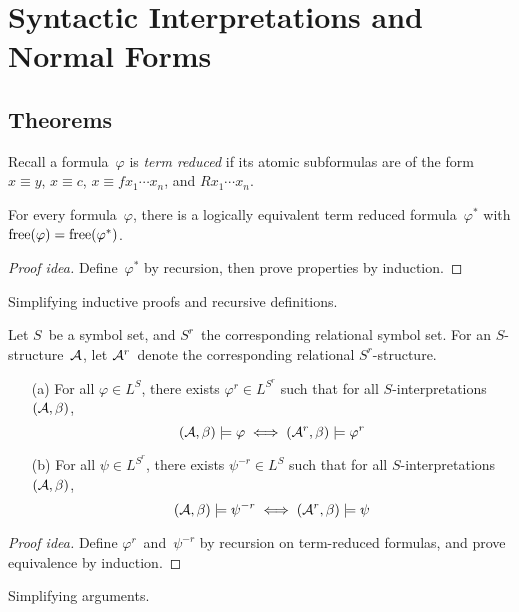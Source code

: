 %
%
\section{Syntactic Interpretations and Normal Forms}
\subsection*{Theorems}
Recall a formula~\(\varphi\) is \emph{term reduced} if its atomic subformulas are of the form \(x\equiv y\), \(x\equiv c\), \(x\equiv f x_1\cdots x_n\), and \(R x_1\cdots x_n\).

\begin{thm}
For every formula~\(\varphi\), there is a logically equivalent term reduced formula~\(\varphi^*\) with \(\operatorname{free}(\varphi)=\operatorname{free}(\varphi^*)\).
\end{thm}
\begin{proof}[Proof idea]
Define~\(\varphi^*\) by recursion, then prove properties by induction.
\end{proof}
\begin{app}
Simplifying inductive proofs and recursive definitions.
\end{app}

\begin{thm}
Let \(S\)~be a symbol set, and \(S^r\)~the corresponding relational symbol set. For an \(S\)-structure~\(\mathcal{A}\), let \(\mathcal{A}^r\)~denote the corresponding relational \(S^r\)-structure.
\begin{enumerate}[itemsep=0pt]
\item[(a)] For all \(\varphi\in L^S\), there exists \(\varphi^r\in L^{S^r}\) such that for all \(S\)-interpretations \((\mathcal{A},\beta)\),
\[(\mathcal{A},\beta)\models\varphi\iff(\mathcal{A}^r,\beta)\models\varphi^r\]
\item[(b)] For all \(\psi\in L^{S^r}\), there exists \(\psi^{-r}\in L^S\) such that for all \(S\)-interpretations \((\mathcal{A},\beta)\),
\[(\mathcal{A},\beta)\models\psi^{-r}\iff(\mathcal{A}^r,\beta)\models\psi\]
\end{enumerate}
\end{thm}
\begin{proof}[Proof idea]
Define \(\varphi^r\)~and~\(\psi^{-r}\) by recursion on term-reduced formulas, and prove equivalence by induction.
\end{proof}
\begin{app}
Simplifying arguments.
\end{app}

